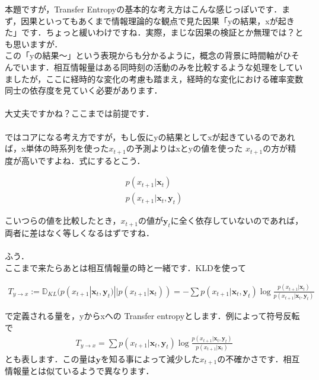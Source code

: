 \documentclass[11pt,a4paper]{ujreport}
\begin{document}
本題ですが，Transfer Entropyの基本的な考え方はこんな感じっぽいです．まず，因果といってもあくまで情報理論的な観点で見た因果「yの結果，xが起きた」です．ちょっと緩いわけですね．実際，まじな因果の検証とか無理では？とも思いますが．\\

この「yの結果～」という表現からも分かるように，概念の背景に時間軸がひそんでいます．相互情報量はある同時刻の活動のみを比較するような処理をしていましたが，ここに経時的な変化の考慮も踏まえ，経時的な変化における確率変数同士の依存度を見ていく必要があります．\\
\\

大丈夫ですかね？ここまでは前提です．\\
\\

ではコアになる考え方ですが，もし仮にyの結果としてxが起きているのであれば，x単体の時系列を使った$x_{t+1}$の予測よりはxとyの値を使った $x_{t+1}$の方が精度が高いですよね．式にするとこう．

\begin{eqnarray}
\label{eq:TL1}
  p(x_{t+1}| \mathbf{x}_t) \nonumber \\
  p(x_{t+1}| \mathbf{x}_t, \mathbf{y}_t) \nonumber
\end{eqnarray}

こいつらの値を比較したとき，$x_{t+1}$の値が$\mathbf{y}_t$に全く依存していないのであれば，両者に差はなく等しくなるはずですね．\\
\\

ふう．
\\

ここまで来たらあとは相互情報量の時と一緒です．KLDを使って

\begin{eqnarray}
\label{eq:TE1}
  T_{y\rightarrow x} := \mathbb{D}_{KL}(p(x_{t+1}| \mathbf{x}_t, \mathbf{y}_t) || p(x_{t+1}| \mathbf{x}_t)) = -\sum p(x_{t+1}| \mathbf{x}_t, \mathbf{y}_t) \log \frac{p(x_{t+1}| \mathbf{x}_t)}{p(x_{t+1}| \mathbf{x}_t, \mathbf{y}_t)} 
\end{eqnarray}

で定義される量を，yからxへの Transfer entropyとします．例によって符号反転で
\begin{eqnarray}
\label{eq:TE2}
  T_{y\rightarrow x} = \sum p(x_{t+1}| \mathbf{x}_t, \mathbf{y}_t) \log \frac{p(x_{t+1}| \mathbf{x}_t, \mathbf{y}_t)}{p(x_{t+1}| \mathbf{x}_t)} 
\end{eqnarray}
とも表します．この量は$\mathbf{y}$を知る事によって減少した$x_{t+1}$の不確かさです．相互情報量とは似ているようで異なります．\\
\\
\end{document}
